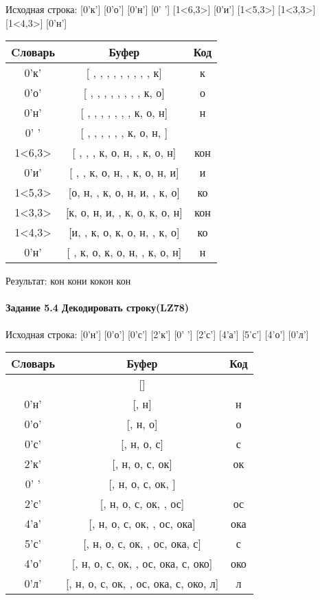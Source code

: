 \documentclass[a4paper, 12pt]{article}
\begin{document}
Исходная строка: [0'к'] [0'о'] [0'н'] [0' '] [1<6,3>] [0'и'] [1<5,3>] [1<3,3>] [1<4,3>] [0'н']\\
\begin{table}[h!]
\centering
\begin{tabular}{|c|c|c|}
\hline
 Cловарь & Буфер & Код  \\ \hline
0'к' & [ ,  ,  ,  ,  ,  ,  ,  ,  , к] & к
\\ \hline
0'о' & [ ,  ,  ,  ,  ,  ,  ,  , к, о] & о
\\ \hline
0'н' & [ ,  ,  ,  ,  ,  ,  , к, о, н] & н
\\ \hline
0' ' & [ ,  ,  ,  ,  ,  , к, о, н,  ] &  
\\ \hline
1<6,3> & [ ,  ,  , к, о, н,  , к, о, н] & кон
\\ \hline
0'и' & [ ,  , к, о, н,  , к, о, н, и] & и
\\ \hline
1<5,3> & [о, н,  , к, о, н, и,  , к, о] &  ко
\\ \hline
1<3,3> & [к, о, н, и,  , к, о, к, о, н] & кон
\\ \hline
1<4,3> & [и,  , к, о, к, о, н,  , к, о] &  ко
\\ \hline
0'н' & [ , к, о, к, о, н,  , к, о, н] & н
\\ \hline
\end{tabular}
\end{table}

Результат: кон кони кокон кон
\pagebreak
\paragraph{Задание 5.4 Декодировать строку(LZ78)\\}

Исходная строка: [0'н'] [0'о'] [0'с'] [2'к'] [0' '] [2'с'] [4'а'] [5'с'] [4'о'] [0'л']\\
\begin{table}[h!]
\centering
\begin{tabular}{|c|c|c|}
\hline
 Cловарь & Буфер & Код  \\ \hline
 & [] & 
\\ \hline
0'н' & [, н] & н
\\ \hline
0'о' & [, н, о] & о
\\ \hline
0'с' & [, н, о, с] & с
\\ \hline
2'к' & [, н, о, с, ок] & ок
\\ \hline
0' ' & [, н, о, с, ок,  ] &  
\\ \hline
2'с' & [, н, о, с, ок,  , ос] & ос
\\ \hline
4'а' & [, н, о, с, ок,  , ос, ока] & ока
\\ \hline
5'с' & [, н, о, с, ок,  , ос, ока,  с] &  с
\\ \hline
4'о' & [, н, о, с, ок,  , ос, ока,  с, око] & око
\\ \hline
0'л' & [, н, о, с, ок,  , ос, ока,  с, око, л] & л
\\ \hline
\end{tabular}
\end{table}
\end{document}
